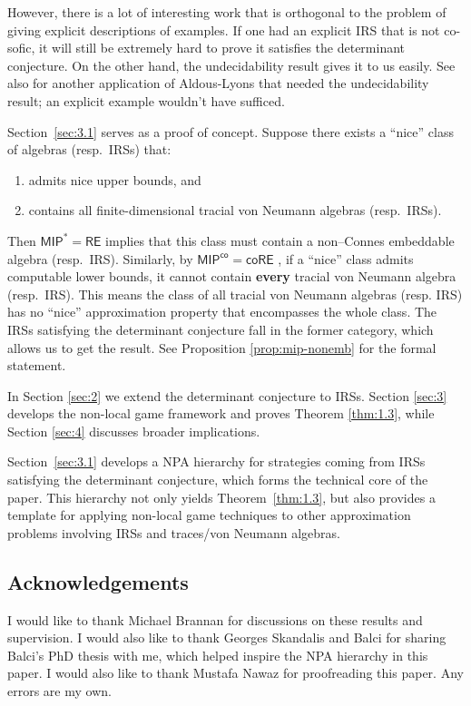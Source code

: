 \documentclass[pdflatex,sn-mathphys-num]{sn-jnl}%
\begin{document}
However, there is a lot of interesting work that is orthogonal to the problem of giving explicit descriptions of examples. If one had an explicit IRS that is not co-sofic, it will still be extremely hard to prove it satisfies the determinant conjecture. On the other hand, the undecidability result gives it to us easily. See also \cite{lyons_ineffectiveness_2025} for another application of Aldous-Lyons that needed the undecidability result; an explicit example wouldn't have sufficed.

Section~\ref{sec:3.1} serves as a proof of concept.  
Suppose there exists a ``nice'' class of algebras (resp.\ IRSs) that:
\begin{enumerate}
    \item admits nice upper bounds, and
    \item contains all finite-dimensional tracial von Neumann algebras (resp.\ IRSs).
\end{enumerate}
Then $\mathsf{MIP}^* = \mathsf{RE}$
 implies that this class must contain a non--Connes embeddable algebra (resp.\ IRS).  
Similarly, by $\mathsf{MIP}^{\mathsf{co}} = \mathsf{coRE}$
, if a ``nice'' class admits computable lower bounds, it cannot contain \textbf{every} tracial von Neumann algebra (resp.\ IRS). This means the class of all tracial von Neumann algebras (resp. IRS) has no ``nice'' approximation property that encompasses the whole class. The IRSs satisfying the determinant conjecture fall in the former category, which allows us to get the result. See Proposition \ref{prop:mip-nonemb} for the formal statement.

In Section \ref{sec:2} we extend the determinant conjecture to IRSs. Section \ref{sec:3} develops the non-local game framework and proves Theorem \ref{thm:1.3}, while Section \ref{sec:4} discusses broader implications.

Section~\ref{sec:3.1} develops a NPA hierarchy for strategies coming from IRSs satisfying the determinant conjecture, which forms the technical core of the paper. This hierarchy not only yields Theorem~\ref{thm:1.3}, but also provides a template for applying non-local game techniques to other approximation problems involving IRSs and traces/von Neumann algebras.

\subsection*{Acknowledgements}
    I would like to thank Michael Brannan for discussions on these results and supervision. I would also like to thank Georges Skandalis and Balci for sharing Balci's PhD thesis with me, which helped inspire the NPA hierarchy in this paper. I would also like to thank Mustafa Nawaz for proofreading this paper. Any errors 
    are my own.
\end{document}
